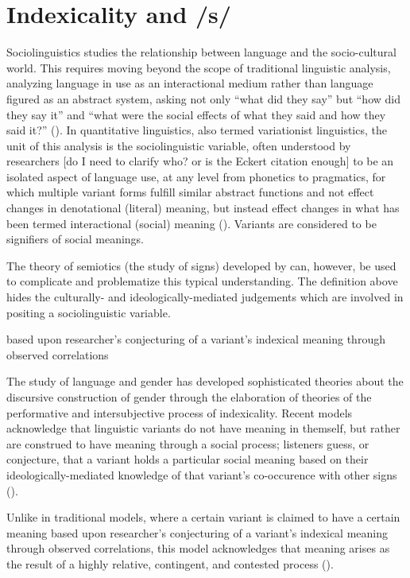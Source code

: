 \section{Indexicality and /s/}
Sociolinguistics studies the relationship between language and the socio-cultural world. This requires moving beyond the scope of traditional linguistic analysis, analyzing language in use as an interactional medium rather than language figured as an abstract system, asking not only ``what did they say'' but ``how did they say it'' and ``what were the social effects of what they said and how they said it?'' (\cite{silverstein_language_2023}). In quantitative linguistics, also termed variationist linguistics, the unit of this analysis is the sociolinguistic variable, often understood by researchers [do I need to clarify who? or is the Eckert citation enough] to be an isolated aspect of language use, at any level from phonetics to pragmatics, for which multiple variant forms fulfill similar abstract functions and not effect changes in denotational (literal) meaning, but instead effect changes in what has been termed interactional (social) meaning (\cite{eckert_three_2012}). Variants are considered to be signifiers of social meanings. 



The theory of semiotics (the study of signs) developed by \textcite{gal_signs_2019} can, however, be used to complicate and problematize this typical understanding. The definition above hides the culturally- and ideologically-mediated judgements which are involved in positing a sociolinguistic variable. 

 based upon researcher's conjecturing of a variant's indexical meaning through observed correlations

The study of language and gender has developed sophisticated theories about the discursive construction of gender through the elaboration of theories of the performative and intersubjective process of indexicality. Recent models acknowledge that linguistic variants do not have meaning in themself, but rather are construed to have meaning through a social process; listeners guess, or conjecture, that a variant holds a particular social meaning based on their ideologically-mediated knowledge of that variant's co-occurence with other signs (\cite{gal_signs_2019}).  

Unlike in traditional models, where a certain variant is claimed to have a certain meaning based upon researcher's conjecturing of a variant's indexical meaning through observed correlations, this model acknowledges that meaning arises as the result of a highly relative, contingent, and contested process (\cite{ckert_three_2012}).



